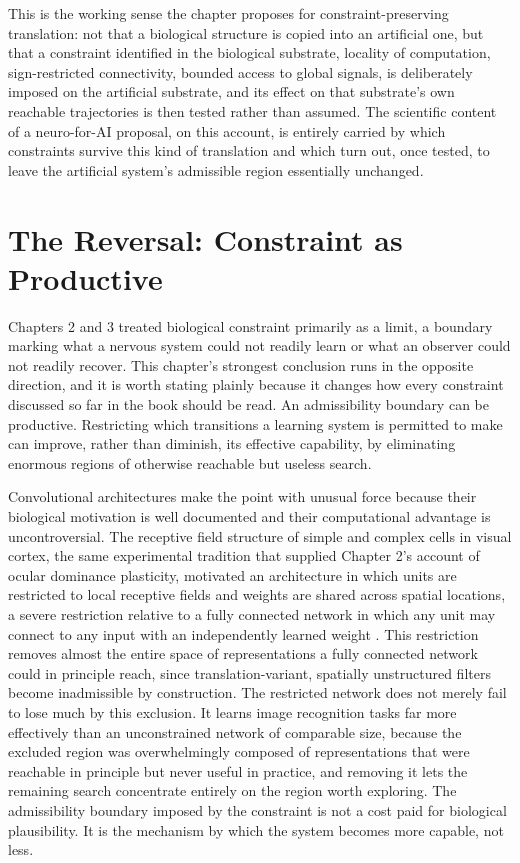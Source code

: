 \documentclass[11pt]{book}
\begin{document}
This is the working sense the chapter proposes for constraint-preserving translation: not that a biological structure is copied into an artificial one, but that a constraint identified in the biological substrate, locality of computation, sign-restricted connectivity, bounded access to global signals, is deliberately imposed on the artificial substrate, and its effect on that substrate's own reachable trajectories is then tested rather than assumed. The scientific content of a neuro-for-AI proposal, on this account, is entirely carried by which constraints survive this kind of translation and which turn out, once tested, to leave the artificial system's admissible region essentially unchanged.

\section{The Reversal: Constraint as Productive}

Chapters 2 and 3 treated biological constraint primarily as a limit, a boundary marking what a nervous system could not readily learn or what an observer could not readily recover. This chapter's strongest conclusion runs in the opposite direction, and it is worth stating plainly because it changes how every constraint discussed so far in the book should be read. An admissibility boundary can be productive. Restricting which transitions a learning system is permitted to make can improve, rather than diminish, its effective capability, by eliminating enormous regions of otherwise reachable but useless search.

Convolutional architectures make the point with unusual force because their biological motivation is well documented and their computational advantage is uncontroversial. The receptive field structure of simple and complex cells in visual cortex, the same experimental tradition that supplied Chapter 2's account of ocular dominance plasticity, motivated an architecture in which units are restricted to local receptive fields and weights are shared across spatial locations, a severe restriction relative to a fully connected network in which any unit may connect to any input with an independently learned weight \cite{fukushima1980, lecun1989}. This restriction removes almost the entire space of representations a fully connected network could in principle reach, since translation-variant, spatially unstructured filters become inadmissible by construction. The restricted network does not merely fail to lose much by this exclusion. It learns image recognition tasks far more effectively than an unconstrained network of comparable size, because the excluded region was overwhelmingly composed of representations that were reachable in principle but never useful in practice, and removing it lets the remaining search concentrate entirely on the region worth exploring. The admissibility boundary imposed by the constraint is not a cost paid for biological plausibility. It is the mechanism by which the system becomes more capable, not less.
\end{document}
